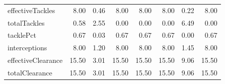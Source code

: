 \begin{table}[H]
\begin{tabular}{lrrrrrrr}
effectiveTackles & 8.00 & 0.46 & 8.00 & 8.00 & 8.00 & 0.22 & 8.00 \\
totalTackles & 0.58 & 2.55 & 0.00 & 0.00 & 0.00 & 6.49 & 0.00 \\
tacklePct & 0.67 & 0.03 & 0.67 & 0.67 & 0.67 & 0.00 & 0.67 \\
interceptions & 8.00 & 1.20 & 8.00 & 8.00 & 8.00 & 1.45 & 8.00 \\
effectiveClearance & 15.50 & 3.01 & 15.50 & 15.50 & 15.50 & 9.06 & 15.50 \\
totalClearance & 15.50 & 3.01 & 15.50 & 15.50 & 15.50 & 9.06 & 15.50 \\
\hline
\end{tabular}
\end{table}
